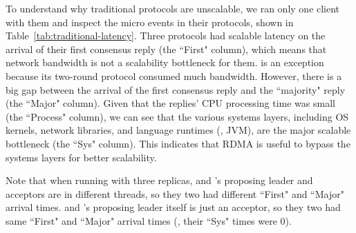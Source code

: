 

To understand why traditional protocols are unscalable, we ran 
only one client with them and inspect the micro events in their protocols, 
shown in Table~\ref{tab:traditional-latency}. Three protocols had scalable 
latency on the arrival of their first consensus reply (the ``First" column), 
which means that network bandwidth is not a scalability bottleneck for them.  
\libpaxos is an exception because its two-round protocol consumed much 
bandwidth. However, there is a big gap between the arrival of the first 
consensus reply and the ``majority" reply (the ``Major" column). Given that the 
replies' CPU processing time was small (the ``Process" column), we can see that 
the various systems layers, including OS kernels, network libraries, and 
language runtimes (\eg, JVM), are the major scalable bottleneck (the ``Sys" 
column). This indicates that RDMA is useful to bypass the systems layers for 
better scalability.

Note that when running with three replicas, \libpaxos and \crane's proposing 
leader and acceptors are in different threads, so they two had different 
``First" and ``Major" arrival times. \crane and \spaxos's proposing 
leader itself is just an acceptor, so they two had same ``First" and ``Major" 
arrival times (\ie, their ``Sys" times were 0).


